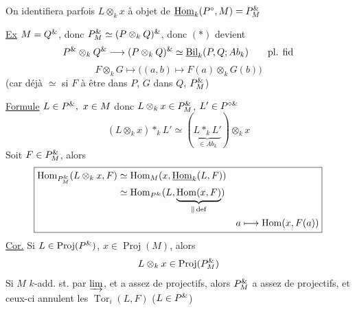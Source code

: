 On identifiera parfois $L\otimes_kx$ à objet de
$\underline{\mathrm{Hom}}_k(P^\circ,M)=P_M^{{\&}}$

\uline{Ex} $M=Q^{{\&}}$, donc $P_M^{{\&}}\simeq(P\otimes_kQ)^{{\&}}$,
donc $(*)$ devient
\[
P^{{\&}}\otimes_kQ^{{\&}}\longrightarrow
(P\otimes_kQ)^{{\&}}\simeq\underline{\operatorname{Bil}}_k(P,Q;Ab_k)
\qquad\text{{pl. fid}}
\]
\[
F\otimes_kG\longmapsto\big((a,b)\longmapsto F(a)\otimes_kG(b)\big)
\]
 (car déjà $\simeq$ si  $F$ à être dans $P$,
$G$ dans $Q$,   $P_M^{{\&}}$)

\uline{Formule} $L\in P^{\unsure{\&}},\ x\in M$ donc $L\otimes_kx\in P_M^{{\&}}$,
$L'\in P^{\circ{\&}}$
\[
\boxed{(L\otimes_kx)*_kL'\simeq
(\underbrace{L*_kL'}_{\in Ab_k})\otimes_kx}
\]
Soit $F\in P_M^{{\&}}$, alors
\[
\boxed{\begin{aligned}
\mathrm{Hom}_{P_M^{{\&}}}(L\otimes_kx,F)
&\simeq\mathrm{Hom}_M(x,\underline{\mathrm{Hom}}_k(L,F))\\
&\simeq\mathrm{Hom}_{P^{{\&}}}(L,
\underbrace{\mathrm{Hom}(x,F)}_{\parallel\,\mathrm{def}})\\
&&a\longmapsto\mathrm{Hom}(x,F(a))
\end{aligned}}
\]
\uline{Cor.} Si $L\in\operatorname{Proj}(P^{{\&}})$, $x\in\operatorname{Proj}(M)$, alors
\[
L\otimes_kx\in\operatorname{Proj}(P_M^{{\&}})
\]
 Si $M$ $k$-add. st. par $\varinjlim$, et a assez de projectifs,
alors $P_M^{{\&}}$ a assez de projectifs, et ceux-ci annulent les
$\operatorname{Tor}_i(L,F)$ ($L\in P^{{\&}}$)
